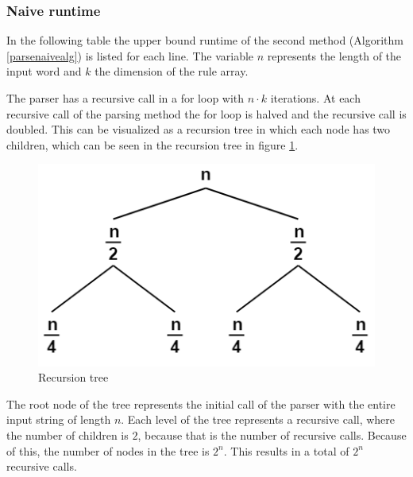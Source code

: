 \documentclass[a4paper, 11pt]{article}
\begin{document}
\subsubsection{Naive runtime}
\label{naiveruntime}

In the following table the upper bound runtime of the second method (Algorithm \ref{parsenaivealg}) is listed for each line. The variable $n$ represents the length of the input word and $k$ the dimension of the rule array.

The parser has a recursive call in a for loop with $n \cdot k$ iterations. At each recursive call of the parsing method the for loop is halved and the recursive call is doubled. This can be visualized as a recursion tree in which each node has two children, which can be seen in the recursion tree in figure \ref{rt}.

\begin{figure}[H]
\begin{center}
\includegraphics[scale=0.55]{images/rt.png}
\caption{Recursion tree \cite{picrt}}
\label{rt}
\end{center}
\end{figure}

The root node of the tree represents the initial call of the parser with the entire input string of length $n$. Each level of the tree represents a recursive call, where the number of children is $2$, because that is the number of recursive calls. Because of this, the number of nodes in the tree is $2^n$. This results in a total of $2^n$ recursive calls.
\end{document}
